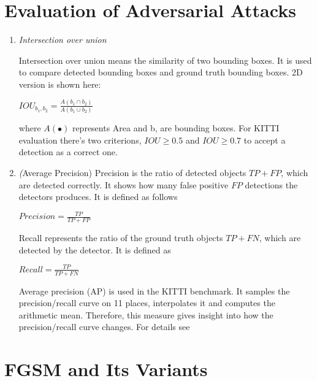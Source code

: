 \section{Evaluation of Adversarial Attacks}
\begin{enumerate}
\item\textit{Intersection over union}

Intersection over union means the similarity of two bounding boxes. It is used to compare detected bounding boxes and ground truth bounding boxes. 2D version is shown here:
\begin{center}
          \(IOU_{b_{1},b_{2}} = \frac{A(b_{1}\cap b_{2})}{A(b_{1}\cup b_{2})} \)
\end{center}
where \(A(\bullet)\) represents Area and b, are bounding boxes. For KITTI\cite{geiger_vision_2013} evaluation there's two criterions, \(IOU\geq0.5\) and \(IOU\geq0.7\) to accept a detection as a correct one.

\item\textit(Average Precision)
Precision is the ratio of detected objects \(TP+FP\), which are detected correctly. It shows how many false positive \(FP\) detections the detectors produces. It is defined as follows
\begin{center}
          \(Precision = \frac{TP}{TP+FP} \)
\end{center}
Recall represents the ratio of the ground truth objects \(TP+FN\), which are detected by the detector. It is defined as 
\begin{center}
          \(Recall = \frac{TP}{TP+FN} \)
\end{center}
Average precision (AP) is used in the KITTI benchmark. It samples the precision/recall curve on 11 places, interpolates it and computes the arithmetic mean. Therefore, this measure gives insight into how the precision/recall curve changes. For details see\cite{everingham_pascal_2010}

\end{enumerate}

\section{FGSM and Its Variants}

